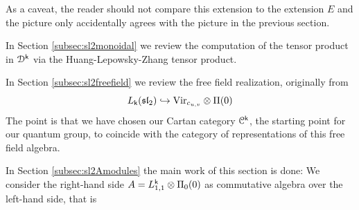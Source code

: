 \documentclass[a4paper, reqno]{amsart}
\theoremstyle{introTheorems}
\newcommand\cC{\mathcal{C}}
\newcommand\cD{\mathcal{D}}
\renewcommand\sl{\mathfrak{sl}}
\newcommand\Vir{\textup{Vir}}
\renewcommand{\1}{\mathbbold{1}}
\begin{document}

 \begin{center}
\end{center}
As a caveat, the reader should not compare this extension to the extension $E$ and the picture only accidentally agrees with the picture in the previous section. 


In Section \ref{subsec:sl2monoidal} we review the computation of the tensor product in $\cD^\k$ via the Huang-Lepowsky-Zhang tensor product.

In Section \ref{subsec:sl2freefield} we review the free field realization, originally from \cite{A} 
\[   L_\k(\sl_2)\hookrightarrow \Vir_{c_{u,v}}\otimes \Pi(0)\]
The point is that we have chosen our Cartan category $\cC^\k$, the starting point for our quantum group, to coincide with the category of representations of this free field algebra.

 In Section \ref{subsec:sl2Amodules} the main work of this section is done: We consider the right-hand side  $A=L^{\mathsf{k}}_{1,1}\otimes \Pi_0(0)$ as commutative algebra over the left-hand side, that is  


 
 \begin{center}
\end{center}
 
\end{document}

